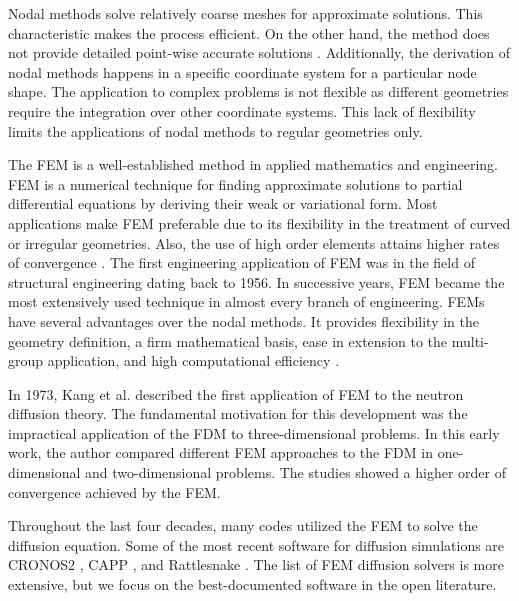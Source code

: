 Nodal methods solve relatively coarse meshes for approximate solutions.
This characteristic makes the process efficient.
On the other hand, the method does not provide detailed point-wise accurate solutions \cite{kang_finite_1973}.
Additionally, the derivation of nodal methods happens in a specific coordinate system for a particular node shape.
The application to complex problems is not flexible as different geometries require the integration over other coordinate systems.
This lack of flexibility limits the applications of nodal methods to regular geometries only.

The \gls{FEM} is a well-established method in applied mathematics and engineering.
\gls{FEM} is a numerical technique for finding approximate solutions to partial differential equations by deriving their weak or variational form.
Most applications make \gls{FEM} preferable due to its flexibility in the treatment of curved or irregular geometries.
Also, the use of high order elements attains higher rates of convergence \cite{cavdar_finite_2004}.
The first engineering application of \gls{FEM} was in the field of structural engineering dating back to 1956.
In successive years, \gls{FEM} became the most extensively used technique in almost every branch of engineering.
\glspl{FEM} have several advantages over the nodal methods.
It provides flexibility in the geometry definition, a firm mathematical basis, ease in extension to the multi-group application, and high computational efficiency \cite{lee_development_2008}.

In 1973, Kang et al. \cite{kang_finite_1973} described the first application of \gls{FEM} to the neutron diffusion theory.
The fundamental motivation for this development was the impractical application of the \gls{FDM} to three-dimensional problems.
In this early work, the author compared different \gls{FEM} approaches to the \gls{FDM} in one-dimensional and two-dimensional problems.
The studies showed a higher order of convergence achieved by the \gls{FEM}.

Throughout the last four decades, many codes utilized the \gls{FEM} to solve the diffusion equation.
Some of the most recent software for diffusion simulations are CRONOS2 \cite{lautard_cronos_1990}, CAPP \cite{lee_development_2011}, and Rattlesnake \cite{wang_rattlesnake_2019}.
The list of \gls{FEM} diffusion solvers is more extensive, but we focus on the best-documented software in the open literature.

